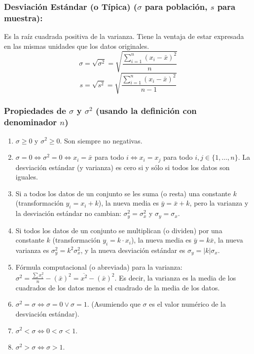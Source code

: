 \documentclass[12pt, letterpaper]{article}
\begin{document}
\subsubsection{Desviación Estándar (o Típica) ($\sigma$ para población, $s$ para muestra):}
Es la raíz cuadrada positiva de la varianza. Tiene la ventaja de estar expresada en las mismas unidades que los datos originales.
\[ \sigma = \sqrt{\sigma^2} = \sqrt{\frac{\sum_{i=1}^{n} (x_i - \bar{x})^2}{n}} \]
\[ s = \sqrt{s^2} = \sqrt{\frac{\sum_{i=1}^{n} (x_i - \bar{x})^2}{n-1}} \]

\subsubsection{Propiedades de $\sigma$ y $\sigma^2$ (usando la definición con denominador $n$)}
\begin{center}
	\begin{enumerate}
		\item $\sigma \ge 0$ y $\sigma^2 \ge 0$. Son siempre no negativas.
		\item $\sigma = 0 \iff \sigma^2 = 0 \iff x_i = \bar{x}$ para todo $i \iff x_i = x_j$ para todo $i, j \in \{1, \dots, n\}$. La desviación estándar (y varianza) es cero si y sólo si todos los datos son iguales.
		\item Si a todos los datos de un conjunto se les suma (o resta) una constante $k$ (transformación $y_i = x_i + k$), la nueva media es $\bar{y} = \bar{x} + k$, pero la varianza y la desviación estándar no cambian: $\sigma_y^2 = \sigma_x^2$ y $\sigma_y = \sigma_x$.
		\item Si todos los datos de un conjunto se multiplican (o dividen) por una constante $k$ (transformación $y_i = k \cdot x_i$), la nueva media es $\bar{y} = k\bar{x}$, la nueva varianza es $\sigma_y^2 = k^2 \sigma_x^2$, y la nueva desviación estándar es $\sigma_y = |k| \sigma_x$.
		\item Fórmula computacional (o abreviada) para la varianza: $\sigma^2 = \frac{\sum x_i^2}{n} - (\bar{x})^2 = \overline{x^2} - (\bar{x})^2$. Es decir, la varianza es la media de los cuadrados de los datos menos el cuadrado de la media de los datos.
		\item $\sigma^2=\sigma \iff \sigma=0 \vee \sigma=1$. (Asumiendo que $\sigma$ es el valor numérico de la desviación estándar).
		\item $\sigma^2 < \sigma \iff 0 < \sigma < 1$.
		\item $\sigma^2 > \sigma \iff \sigma > 1$.
	\end{enumerate}
\end{center}
\newpage
\end{document}
